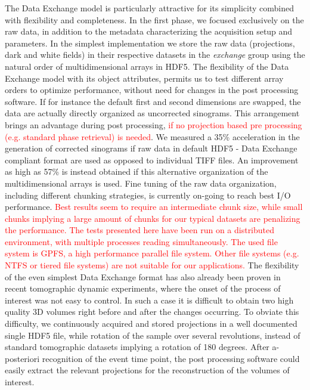 \documentclass[pdf]{iucr}              %
\begin{document}
The Data Exchange model is particularly attractive for its simplicity combined with flexibility and completeness. In the first phase, we focused exclusively on the raw data, in addition to the metadata characterizing the acquisition setup and parameters. In the simplest implementation we store the raw data (projections, dark and white fields) in their respective datasets in the \emph{exchange} group using the natural order of multidimensional arrays in HDF5. The flexibility of the Data Exchange model with its object attributes, permits us to test different array orders to optimize performance, without need for changes in the post processing software. If for instance the default first and second dimensions are swapped, the data are actually directly organized as uncorrected sinograms. This arrangement brings an advantage during post processing, \textcolor{red}{if no projection based pre processing (e.g. standard phase retrieval) is needed}. We measured a 35\% acceleration in the generation of corrected sinograms if raw data in default HDF5 - Data Exchange compliant format are used as opposed to individual TIFF files. An improvement as high as 57\% is instead obtained if this alternative organization of the multidimensional arrays is used. Fine tuning of the raw data organization, including different chunking strategies, is currently on-going to reach best I/O performance. \textcolor{red}{ Best results seem to require an intermediate chunk size, while small chunks implying a large amount of chunks for our typical datasets are penalizing the performance. The tests presented here have been run on a distributed environment, with multiple processes reading simultaneously. The used file system is GPFS, a high performance parallel file system. Other file systems (e.g. NTFS or tiered file systems) are not suitable for our applications.}
The flexibility of the even simplest Data Exchange format has also already been proven in recent tomographic dynamic experiments, where the onset of the process of interest was not easy to control. In such a case it is difficult to obtain two high quality 3D volumes right before and after the changes occurring. To obviate this difficulty, we continuously acquired and stored projections in a well documented single HDF5 file, while rotation of the sample over several revolutions, instead of standard tomographic datasets implying a rotation of 180 degrees. After a-posteriori recognition of the event time point, the post processing software could easily extract the relevant projections for the reconstruction of the volumes of interest. 
\end{document}
